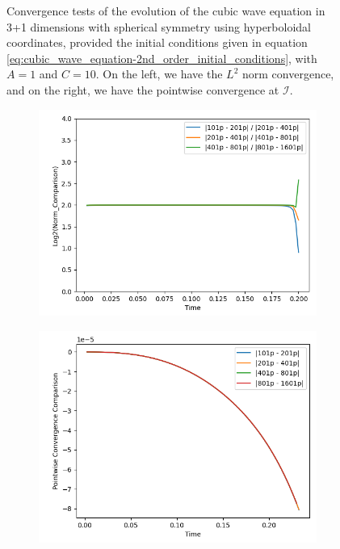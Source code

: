 \begin{figure}[h]
\begin{subfigure}[b]{0.45\textwidth}
    \end{subfigure}
    \caption{Convergence tests of the evolution of the cubic wave equation in 3+1 dimensions with spherical symmetry using hyperboloidal coordinates, provided the initial conditions given in equation \eqref{eq:cubic_wave_equation-2nd_order_initial_conditions}, with $A=1$ and $C=10$. On the left, we have the $L^2$ norm convergence, and on the right, we have the pointwise convergence at $\mathscr{I}$.}
    \label{fig:cubic_wave_eq_convergence-1}
\end{figure}

\begin{figure}[h]
    \centering
    \begin{subfigure}[b]{0.45\textwidth}
        \centering
        \includegraphics[width=\textwidth]{Images/Cubic_Wave_Equation_3+1_Spherical-A=10-Norm.png}
    \end{subfigure}
    \hfill
    \begin{subfigure}[b]{0.45\textwidth}
        \centering
        \includegraphics[width=\textwidth]{Images/Cubic_Wave_Equation_3+1_Spherical-A=10-Pointwise.png}

\end{subfigure}
\end{figure}
